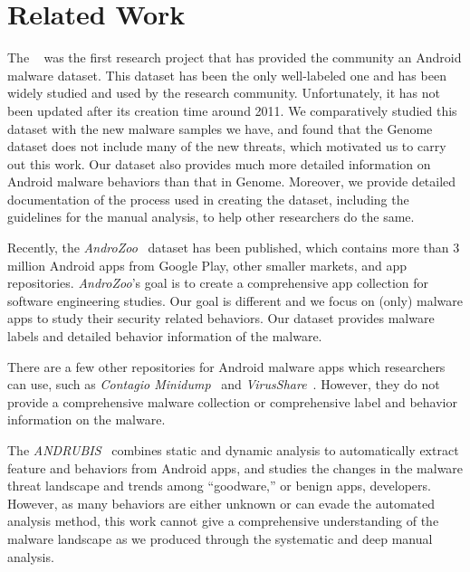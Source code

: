 \vspace{-.1in}
\section{Related Work}
\label{sec:related}
\vspace{-.02in}

The \genome~\cite{zhou2012dissecting} %
was the first research project that has provided the community 
an Android malware dataset. 
This dataset has been the only well-labeled one and has been widely studied 
and used by the research community.
Unfortunately, it has not been updated after its creation time around 2011.
We comparatively studied this dataset with the new malware samples we have, 
and found that the Genome dataset does not include many of the new threats, 
which motivated us to carry out this work. Our dataset also provides much more
detailed information on Android malware behaviors than that in Genome. Moreover,
we provide detailed documentation of the process used in creating the dataset, 
including the guidelines for the manual analysis, to help other researchers
do the same.

Recently, the \emph{AndroZoo}~\cite{allix2015androzoo} dataset has been published, 
which contains more than 3 million Android apps 
from Google Play, other smaller markets, and app repositories.
\emph{AndroZoo}'s goal is to create a comprehensive app collection for software 
engineering studies. Our goal is different and we focus on (only) malware apps 
to study their security related behaviors. Our dataset provides malware labels
and detailed behavior information of the malware. 

There are a few other repositories for Android malware apps 
which researchers can use, such as \emph{Contagio Minidump}~\cite{minidump} 
and \emph{VirusShare}~\cite{virusshare}. However, they do not provide 
a comprehensive malware collection or comprehensive label and behavior information on
the malware.

The \emph{ANDRUBIS}~\cite{lindorfer2014andrubis} combines static and dynamic analysis
to automatically extract feature and behaviors from Android apps, and
studies the changes in the malware threat landscape and trends among ``goodware,'' or
benign apps, developers.
However, as many behaviors are either unknown or can evade the automated analysis method,
this work cannot give a comprehensive understanding of the malware landscape as we 
produced through the systematic and deep manual analysis.

